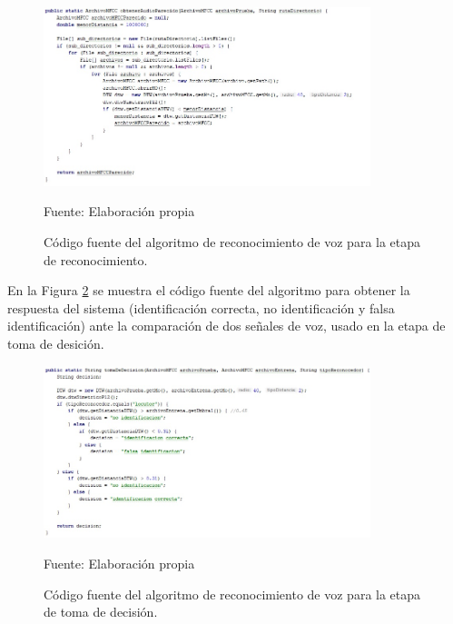 \begin{figure}[H]
\captionsetup{justification=centering}
\begin{center}
\includegraphics[width=0.85\textwidth]{Imagenes/Cap3/image086}
\end{center}
\begin{center}
\vskip -0.5cm
\caption{\small{Código fuente del algoritmo de reconocimiento de voz para la etapa de reconocimiento.}}
\label{fig:figura3.86}
{\small{Fuente: Elaboración propia}}
\end{center}
\end{figure}

En la Figura \ref{fig:figura3.87} se muestra el código fuente del algoritmo para obtener la respuesta del sistema (identificación correcta, no identificación y falsa identificación) ante la comparación de dos señales de voz, usado en la etapa de toma de desición.
\begin{figure}[H]
\captionsetup{justification=centering}
\begin{center}
\includegraphics[width=0.85\textwidth]{Imagenes/Cap3/image087}
\end{center}
\begin{center}
\vskip -0.5cm
\caption{\small{Código fuente del algoritmo de reconocimiento de voz para la etapa de toma de decisión.}}
\label{fig:figura3.87}
{\small{Fuente: Elaboración propia}}
\end{center}
\end{figure}

